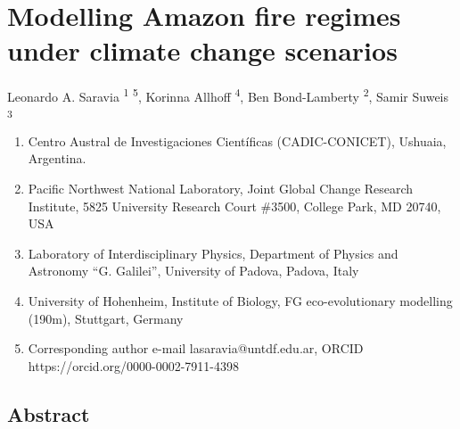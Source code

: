 \documentclass[
]{article}
\author{}
\date{}
\begin{document}
\section{Modelling Amazon fire regimes under climate change
scenarios}\label{modelling-amazon-fire-regimes-under-climate-change-scenarios}

Leonardo A. Saravia \textsuperscript{1} \textsuperscript{5}, Korinna
Allhoff \textsuperscript{4}, Ben Bond-Lamberty \textsuperscript{2},
Samir Suweis \textsuperscript{3}

\begin{enumerate}
\def\labelenumi{\arabic{enumi}.}
\item
  Centro Austral de Investigaciones Científicas (CADIC-CONICET),
  Ushuaia, Argentina.
\item
  Pacific Northwest National Laboratory, Joint Global Change Research
  Institute, 5825 University Research Court \#3500, College Park, MD
  20740, USA
\item
  Laboratory of Interdisciplinary Physics, Department of Physics and
  Astronomy ``G. Galilei'', University of Padova, Padova, Italy
\item
  University of Hohenheim, Institute of Biology, FG eco-evolutionary
  modelling (190m), Stuttgart, Germany
\item
  Corresponding author e-mail lasaravia@untdf.edu.ar, ORCID
  https://orcid.org/0000-0002-7911-4398
\end{enumerate}

\newpage

\subsection{Abstract}\label{abstract}
\end{document}
